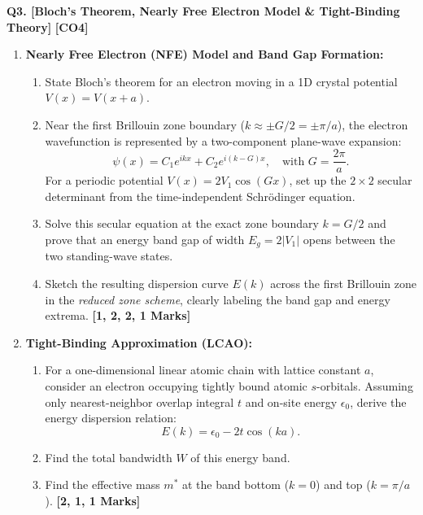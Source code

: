 \documentclass[11pt,a4paper]{article}
\begin{document}
\noindent\textbf{Q3. [Bloch's Theorem, Nearly Free Electron Model \& Tight-Binding Theory]} \hfill \textbf{[CO4]}
\begin{enumerate}[label=(\alph*),leftmargin=1.8em,itemsep=4pt]
    \item \textbf{Nearly Free Electron (NFE) Model and Band Gap Formation:}
    \begin{enumerate}[label=(\roman*),itemsep=1.5pt]
        \item State Bloch's theorem for an electron moving in a 1D crystal potential $V(x) = V(x+a)$.
        \item Near the first Brillouin zone boundary ($k \approx \pm G/2 = \pm \pi/a$), the electron wavefunction is represented by a two-component plane-wave expansion:
        \[
        \psi(x) = C_1 e^{i k x} + C_2 e^{i(k - G)x}, \quad \text{with } G = \frac{2\pi}{a}.
        \]
        For a periodic potential $V(x) = 2V_1 \cos(Gx)$, set up the $2 \times 2$ secular determinant from the time-independent Schr\"odinger equation.
        \item Solve this secular equation at the exact zone boundary $k = G/2$ and prove that an energy band gap of width $E_g = 2|V_1|$ opens between the two standing-wave states.
        \item Sketch the resulting dispersion curve $E(k)$ across the first Brillouin zone in the \textit{reduced zone scheme}, clearly labeling the band gap and energy extrema. \hfill\textbf{[1, 2, 2, 1 Marks]}
    \end{enumerate}

    \item \textbf{Tight-Binding Approximation (LCAO):}
    \begin{enumerate}[label=(\roman*),itemsep=1.5pt]
        \item For a one-dimensional linear atomic chain with lattice constant $a$, consider an electron occupying tightly bound atomic $s$-orbitals. Assuming only nearest-neighbor overlap integral $t$ and on-site energy $\epsilon_0$, derive the energy dispersion relation:
        \[
        E(k) = \epsilon_0 - 2t \cos(ka).
        \]
        \item Find the total bandwidth $W$ of this energy band.
        \item Find the effective mass $m^*$ at the band bottom ($k = 0$) and top ($k = \pi/a$). \hfill\textbf{[2, 1, 1 Marks]}
    \end{enumerate}
\end{enumerate}
\end{document}
